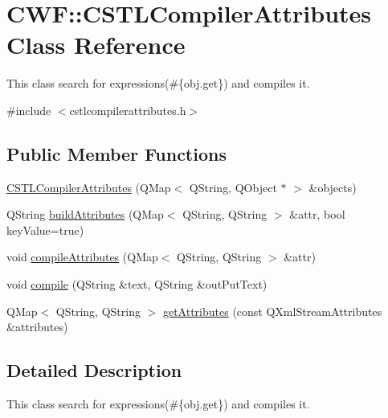 \hypertarget{class_c_w_f_1_1_c_s_t_l_compiler_attributes}{\section{C\+W\+F\+:\+:C\+S\+T\+L\+Compiler\+Attributes Class Reference}
\label{class_c_w_f_1_1_c_s_t_l_compiler_attributes}
}


This class search for expressions(\#\{obj.\+get\}) and compiles it.  




{\ttfamily \#include $<$cstlcompilerattributes.\+h$>$}

\subsection*{Public Member Functions}
\begin{DoxyCompactItemize}
\item 
\hyperlink{class_c_w_f_1_1_c_s_t_l_compiler_attributes_a666a7c7dec101d1313027c1037255446}{C\+S\+T\+L\+Compiler\+Attributes} (Q\+Map$<$ Q\+String, Q\+Object $\ast$ $>$ \&objects)
\item 
Q\+String \hyperlink{class_c_w_f_1_1_c_s_t_l_compiler_attributes_a6c09d18bbc92ae092db120385a7d40de}{build\+Attributes} (Q\+Map$<$ Q\+String, Q\+String $>$ \&attr, bool key\+Value=true)
\item 
void \hyperlink{class_c_w_f_1_1_c_s_t_l_compiler_attributes_a5eccb899f04af2c269845f1e86e07813}{compile\+Attributes} (Q\+Map$<$ Q\+String, Q\+String $>$ \&attr)
\item 
void \hyperlink{class_c_w_f_1_1_c_s_t_l_compiler_attributes_a482a81daba4f114b75445ac54868d572}{compile} (Q\+String \&text, Q\+String \&out\+Put\+Text)
\item 
Q\+Map$<$ Q\+String, Q\+String $>$ \hyperlink{class_c_w_f_1_1_c_s_t_l_compiler_attributes_a4cbbe112e36b86ef01401e1b62804d57}{get\+Attributes} (const Q\+Xml\+Stream\+Attributes \&attributes)
\end{DoxyCompactItemize}


\subsection{Detailed Description}
This class search for expressions(\#\{obj.\+get\}) and compiles it. 

